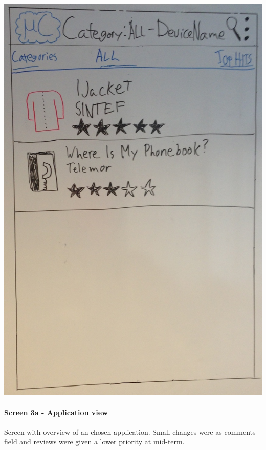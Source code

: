 \begin{image}[H]
\includegraphics[scale=0.2]{images/Design_guide/Screen2b.png}
\end{image}


\paragraph{Screen 3a - Application view}
Screen with overview of an chosen application. Small changes were as comments field and reviews were given a lower priority at mid-term. 

